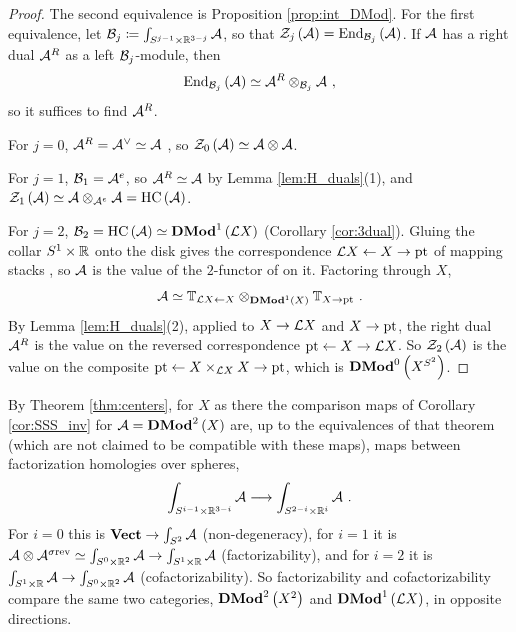 \begin{proof}
The second equivalence is Proposition \ref{prop:int_DMod}. For the first equivalence, let
$\mathcal{B}_j\coloneqq\int_{S^{j-1}\times\mathbb{R}^{3-j}}\mathcal{A}$, so that $\mathcal{Z}_j\left(\mathcal{A}\right)=\operatorname{End}_{\mathcal{B}_j}\left(\mathcal{A}\right)$.
If $\mathcal{A}$ has a right dual $\mathcal{A}^R$ as a left $\mathcal{B}_j$-module, then
\begin{equation*}
\operatorname{End}_{\mathcal{B}_j}\left(\mathcal{A}\right)\simeq\mathcal{A}^R\otimes_{\mathcal{B}_j}\mathcal{A} \ ,
\end{equation*}
so it suffices to find $\mathcal{A}^R$.

For $j=0$, $\mathcal{A}^R=\mathcal{A}^\vee\simeq\mathcal{A}$ \cite[Proposition 3.2.4]{Ber:center}, so
$\mathcal{Z}_0\left(\mathcal{A}\right)\simeq\mathcal{A}\otimes\mathcal{A}$.

For $j=1$, $\mathcal{B}_1=\mathcal{A}^e$, so $\mathcal{A}^R\simeq\mathcal{A}$ by Lemma
\ref{lem:H_duals}(1), and $\mathcal{Z}_1\left(\mathcal{A}\right)\simeq\mathcal{A}\otimes_{\mathcal{A}^e}\mathcal{A}=\operatorname{HC}\left(\mathcal{A}\right)$.

For $j=2$, $\mathcal{B}_2=\operatorname{HC}\left(\mathcal{A}\right)\simeq\mathbf{DMod}^1\left(\mathcal{L} X\right)$ (Corollary \ref{cor:3dual}).
Gluing the collar $S^1\times\mathbb{R}$ onto the disk gives the correspondence
$\mathcal{L} X\leftarrow X\to\text{pt}$ of mapping stacks \cite[Section 3.1]{HoLi}, so $\mathcal{A}$ is the value of
the $2$-functor of \cite[Theorem 6.5.3]{Ber:ShvCatH} on it. Factoring through $X$,
\begin{equation*}
\mathcal{A}\simeq\mathbb{T}_{\mathcal{L} X\leftarrow X}\otimes_{\mathbf{DMod}^1\left(X\right)}\mathbb{T}_{X\to\text{pt}} \ .
\end{equation*}
By Lemma \ref{lem:H_duals}(2), applied to $X\to\mathcal{L} X$ and $X\to\text{pt}$, the right dual $\mathcal{A}^R$ is the
value on the reversed correspondence $\text{pt}\leftarrow X\to\mathcal{L} X$. So $\mathcal{Z}_2\left(\mathcal{A}\right)$ is the
value on the composite $\text{pt}\leftarrow X\times_{\mathcal{L} X}X\to\text{pt}$, which is
$\mathbf{DMod}^0\left(X^{S^2}\right)$.
\end{proof}

\begin{rmk}
\label{rmk:centers_spheres}
By Theorem \ref{thm:centers}, for $X$ as there the comparison maps of Corollary
\ref{cor:SSS_inv} for $\mathcal{A}=\mathbf{DMod}^2\left(X\right)$ are, up to the equivalences of that theorem
(which are not claimed to be compatible with these maps), maps between factorization homologies
over spheres,
\begin{equation*}
\int_{S^{i-1}\times\mathbb{R}^{3-i}}\mathcal{A}\longrightarrow\int_{S^{2-i}\times\mathbb{R}^{i}}\mathcal{A} \ .
\end{equation*}
For $i=0$ this is $\mathbf{Vect}\to\int_{S^2}\mathcal{A}$ (non-degeneracy), for $i=1$ it is
$\mathcal{A}\otimes\mathcal{A}^{\sigma\text{rev}}\simeq\int_{S^0\times\mathbb{R}^2}\mathcal{A}\to\int_{S^1\times\mathbb{R}}\mathcal{A}$
(factorizability), and for $i=2$ it is $\int_{S^1\times\mathbb{R}}\mathcal{A}\to\int_{S^0\times\mathbb{R}^2}\mathcal{A}$
(cofactorizability). So factorizability and cofactorizability compare the same two categories,
$\mathbf{DMod}^2\left(X^2\right)$ and $\mathbf{DMod}^1\left(\mathcal{L} X\right)$, in opposite directions.
\end{rmk}

